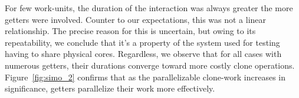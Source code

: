 For few work-units, the duration of the interaction was always greater the more getters were involved. Counter to our expectations, this was not a linear relationship. The precise reason for this is uncertain, but owing to its repeatability, we conclude that it's a property of the system used for testing having to share physical cores. Regardless, we observe that for all cases with numerous getters, their durations converge toward more costly clone operations. Figure~\ref{fig:simo_2} confirms that as the parallelizable clone-work increases in significance, getters parallelize their work more effectively.

\begin{figure}
	\centering
\end{figure}
